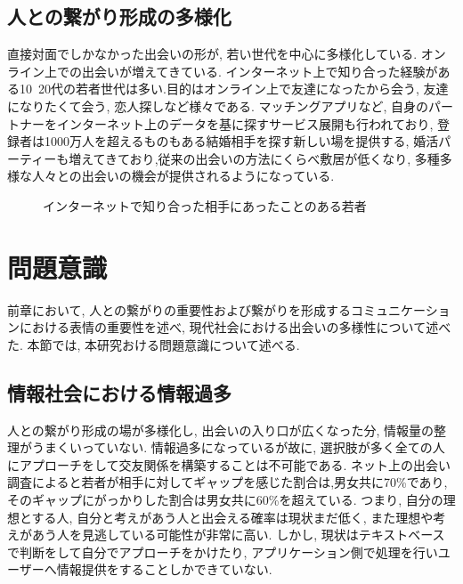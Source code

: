 \subsection{人との繋がり形成の多様化}
直接対面でしかなかった出会いの形が, 若い世代を中心に多様化している. オンライン上での出会いが増えてきている. インターネット上で知り合った経験がある10~20代の若者世代は多い.\cite{mandam}目的はオンライン上で友達になったから会う, 友達になりたくて会う, 恋人探しなど様々である.
マッチングアプリなど, 自身のパートナーをインターネット上のデータを基に探すサービス展開も行われており, 登録者は1000万人を超えるものもある結婚相手を探す新しい場を提供する, 婚活パーティーも増えてきており\cite{chane_claire},従来の出会いの方法にくらべ敷居が低くなり, 多種多様な人々との出会いの機会が提供されるようになっている.

\begin{figure}[htbp]
    \begin{center}
    \end{center}
    \caption{インターネットで知り合った相手にあったことのある若者}
    \label{fig:onlinemeeting_to_real}
\end{figure}



\section{問題意識}
前章において, 人との繋がりの重要性および繋がりを形成するコミュニケーションにおける表情の重要性を述べ, 現代社会における出会いの多様性について述べた.
本節では, 本研究おける問題意識について述べる.
\subsection{情報社会における情報過多}
人との繋がり形成の場が多様化し, 出会いの入り口が広くなった分, 情報量の整理がうまくいっていない.
情報過多になっているが故に, 選択肢が多く全ての人にアプローチをして交友関係を構築することは不可能である.
ネット上の出会い調査によると若者が相手に対してギャップを感じた割合は,男女共に70\%であり,
そのギャップにがっかりした割合は男女共に60\%を超えている.\cite{mandam}
つまり, 自分の理想とする人, 自分と考えがあう人と出会える確率は現状まだ低く, また理想や考えがあう人を見逃している可能性が非常に高い.
しかし, 現状はテキストベースで判断をして自分でアプローチをかけたり, アプリケーション側で処理を行いユーザーへ情報提供をすることしかできていない.

